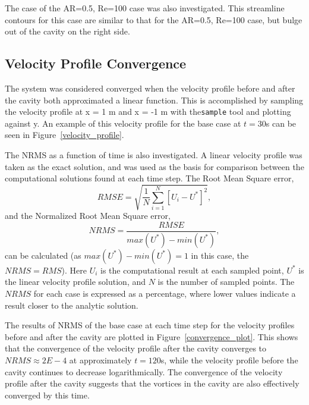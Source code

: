 \documentclass[twocolumn,10pt]{asme2ej}
\begin{document}
The case of the AR=0.5, Re=100 case was also investigated. This streamline contours for this case are similar to that for the AR=0.5, Re=100 case, but bulge out of the cavity on the right side.

\subsection{Velocity Profile Convergence}
The system was considered converged when the velocity profile before and after the cavity both approximated a linear function. This is accomplished by sampling the velocity profile at x = 1 m and x = -1 m with the\lstinline{sample} tool and plotting against y. An example of this velocity profile for the base case at $t=30$s can be seen in Figure~\ref{velocity_profile}.

The NRMS as a function of time is also investigated. A linear velocity profile was taken as the exact solution, and was used as the basis for comparison between the computational solutions found at each time step. The Root Mean Square error,
\begin{equation}
RMSE = \sqrt{\frac{1}{N}\sum\limits_{i=1}^N[U_i - U^*]^2},
\end{equation}
and the Normalized Root Mean Square error,
\begin{equation}
NRMS = \dfrac{RMSE}{max(U^*)-min(U^*)},
\end{equation}
can be calculated (as $max(U^*)-min(U^*) = 1$ in this case, the $NRMS = RMS$). Here $U_i$ is the computational result at each sampled point, $U^*$ is the linear velocity profile solution, and $N$ is the number of sampled points. The $NRMS$ for each case is expressed as a percentage, where lower values indicate a result closer to the analytic solution.

The results of NRMS of the base case at each time step for the velocity profiles before and after the cavity are plotted in Figure~\ref{convergence_plot}. This shows that the convergence of the velocity profile after the cavity converges to $NRMS \approx 2E-4$ at approximately $t=120$s, while the velocity profile before the cavity continues to decrease logarithmically. The convergence of the velocity profile after the cavity suggests that the vortices in the cavity are also effectively converged by this time.
\end{document}

